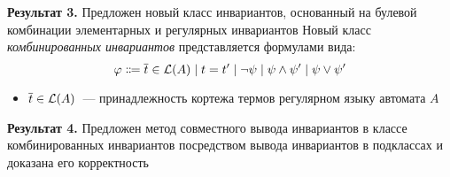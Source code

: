 \begin{frame}{\textbf{Результат 3.} Предложен новый класс инвариантов, основанный на булевой комбинации элементарных и регулярных инвариантов}
Новый класс \emph{комбинированных инвариантов} представляется формулами вида:
$$\varphi \Coloneqq \overline{t}\in \mathcal{L}(A) \mid t = t' \mid \neg\psi \mid \psi \land \psi' \mid \psi \lor \psi'$$
\vspace*{-8mm}
\begin{itemize}
    \item $\overline{t}\in \mathcal{L}(A)$~--- принадлежность кортежа термов регулярном языку автомата $A$
\end{itemize}
\end{frame}

\begin{frame}{\textbf{Результат 4.} Предложен метод совместного вывода инвариантов в классе комбинированных инвариантов посредством вывода инвариантов в подклассах и доказана его корректность}
\whenFullCompile{\centering\ciciPic}
\end{frame}

